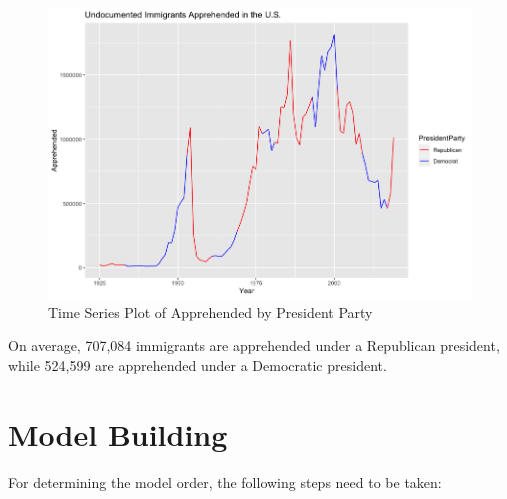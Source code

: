 \documentclass[a4paper]{article}
\begin{document}
\begin{figure}[h!]
\centering
\includegraphics[scale=0.3]{images/partyapp.png}
\caption{Time Series Plot of Apprehended by President Party}
\label{fig:party_app}
\end{figure}

On average, 707,084 immigrants are apprehended under a Republican president, while 524,599 are apprehended under a Democratic president.


\section{Model Building}

For determining the model order, the following steps need to be taken:
\end{document}
